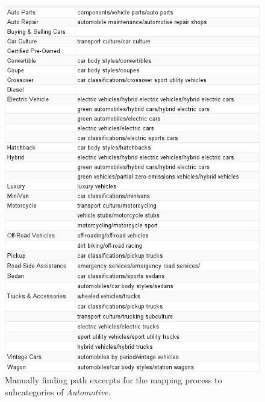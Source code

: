 \begin{figure}[h]
\centering
\includegraphics[width=\textwidth]{Chapters/Results/Manual_classification}
\caption[Manually mapping between categories and path excerpts]{Manually finding path excerpts for the mapping process to subcategories of \emph{Automotive}.}
\label{fig:manualclassification}
\end{figure}

